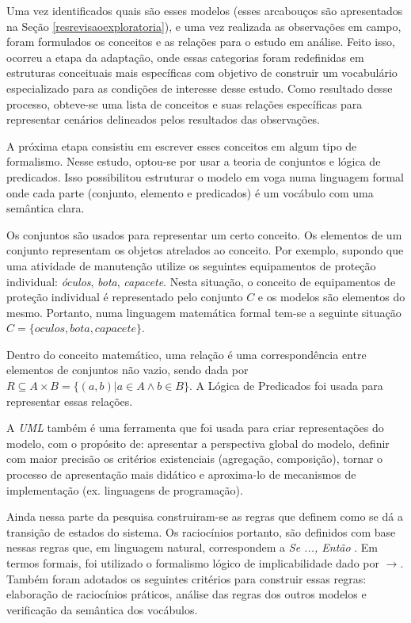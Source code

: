 Uma vez identificados quais são esses modelos (esses arcabouços são apresentados na Seção \ref{resrevisaoexploratoria}), e uma vez realizada as observações em campo, foram formulados os conceitos e as relações para o estudo em análise. Feito isso, ocorreu a etapa da adaptação, onde essas categorias foram redefinidas em estruturas conceituais mais específicas com objetivo de construir um vocabulário especializado para as condições de interesse desse estudo. Como resultado desse processo, obteve-se uma lista de conceitos e suas relações específicas para representar cenários delineados pelos resultados das observações. 

A próxima etapa consistiu em escrever esses conceitos em algum tipo de formalismo. Nesse estudo, optou-se por usar a teoria de conjuntos e lógica de predicados. Isso possibilitou estruturar o modelo em voga numa linguagem formal onde cada parte (conjunto, elemento e predicados) é um vocábulo com uma semântica clara. 

Os conjuntos são usados para representar um certo conceito. Os elementos de um conjunto representam os objetos atrelados ao conceito. Por exemplo, supondo que uma atividade de manutenção utilize os seguintes equipamentos de proteção individual: \textit{óculos}, \textit{bota}, \textit{capacete}.
Nesta situação, o conceito de equipamentos de proteção individual é representado pelo conjunto $C$ e os modelos são elementos do mesmo. Portanto, numa linguagem matemática formal tem-se a seguinte situação $C = \{oculos,bota,capacete\}$. 

Dentro do conceito matemático, uma relação é uma correspondência entre elementos de conjuntos não vazio, sendo dada por $R \subseteq  A \times B = \{(a,b)| a \in A \wedge b \in B \}$. A Lógica de Predicados foi usada para representar essas
relações.

A \textit{UML} também é uma ferramenta que foi usada para criar representações do modelo, com o propósito de: apresentar a perspectiva global do modelo, definir com maior precisão os critérios existenciais (agregação, composição), tornar o processo de apresentação mais didático e aproxima-lo de mecanismos de implementação (ex. linguagens de programação). 

Ainda nessa parte da pesquisa construiram-se as regras que definem como se dá a transição de estados do sistema. Os raciocínios portanto, são definidos com base nessas regras que, em linguagem natural, correspondem a \textit{Se ..., Então }. Em termos formais, foi utilizado o formalismo lógico de implicabilidade dado por $\to$. Também foram adotados os seguintes critérios para construir essas regras: elaboração de raciocínios práticos, análise das regras dos outros modelos e verificação da semântica dos vocábulos.